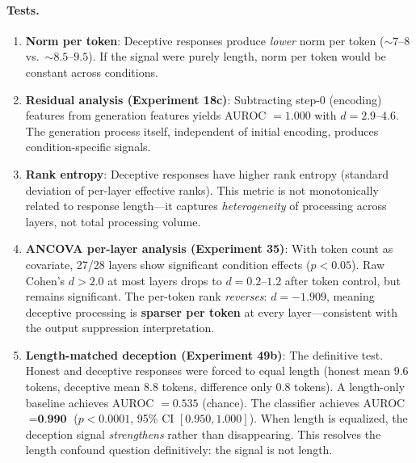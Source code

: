 \paragraph{Tests.}

\begin{enumerate}[leftmargin=*]
    \item \textbf{Norm per token}: Deceptive responses produce \emph{lower} norm per token (${\sim}7$--$8$ vs.\ ${\sim}8.5$--$9.5$). If the signal were purely length, norm per token would be constant across conditions.

    \item \textbf{Residual analysis (Experiment 18c)}: Subtracting step-0 (encoding) features from generation features yields AUROC $= 1.000$ with $d = 2.9$--$4.6$. The generation process itself, independent of initial encoding, produces condition-specific signals.

    \item \textbf{Rank entropy}: Deceptive responses have higher rank entropy (standard deviation of per-layer effective ranks). This metric is not monotonically related to response length---it captures \emph{heterogeneity} of processing across layers, not total processing volume.

    \item \textbf{ANCOVA per-layer analysis (Experiment 35)}: With token count as covariate, 27/28 layers show significant condition effects ($p < 0.05$). Raw Cohen's $d > 2.0$ at most layers drops to $d = 0.2$--$1.2$ after token control, but remains significant. The per-token rank \emph{reverses}: $d = -1.909$, meaning deceptive processing is \textbf{sparser per token} at every layer---consistent with the output suppression interpretation.

    \item \textbf{Length-matched deception (Experiment 49b)}: The definitive test. Honest and deceptive responses were forced to equal length (honest mean 9.6 tokens, deceptive mean 8.8 tokens, difference only 0.8 tokens). A length-only baseline achieves AUROC $= 0.535$ (chance). The classifier achieves AUROC $= \textbf{0.990}$ ($p < 0.0001$, 95\% CI $[0.950, 1.000]$). When length is equalized, the deception signal \emph{strengthens} rather than disappearing. This resolves the length confound question definitively: the signal is not length.


\end{enumerate}
